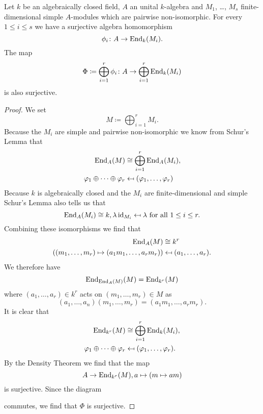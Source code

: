 \begin{lem}\label{lem: map into sum endomorphisms surjective}
 Let $k$ be an algebraically closed field, $A$ an unital $k$-algebra and $M_1$, \dots, $M_s$ finite-dimensional simple $A$-modules which are pairwise non-isomorphic. For every $1 \leq i \leq s$ we have a surjective algebra homomorphism
 \[
  \phi_i \colon A \to \operatorname{End}_k(M_i).
 \]
 The map
 \[
  \Phi \coloneqq \bigoplus_{i=1}^r \phi_i \colon A \to \bigoplus_{i=1}^r \operatorname{End}_k(M_i)
 \]
 is also surjective.
\end{lem}
\begin{proof}
 We set
 \[
  M \coloneqq \bigoplus_{i=1}^r M_i.
 \]
 Because the $M_i$ are simple and pairwise non-isomorphic we know from Schur’s Lemma that
 \begin{align*}
  \operatorname{End}_A(M) &\cong \bigoplus_{i=1}^r \operatorname{End}_A(M_i), \\
  \varphi_1 \oplus \dotsb \oplus \varphi_r &\mapsfrom (\varphi_1, \dotsc, \varphi_r)
 \end{align*}
 Because $k$ is algebraically closed and the $M_i$ are finite-dimensional and simple Schur’s Lemma also tells us that
 \[
  \operatorname{End}_A(M_i) \cong k, \lambda \operatorname{id}_{M_i} \mapsfrom \lambda \text{ for all } 1 \leq i \leq r.
 \]
 Combining these isomorphisms we find that
 \begin{align*}
  \operatorname{End}_A(M) &\cong k^r \\
  ((m_1, \dotsc, m_r) \mapsto (a_1 m_1, \dotsc, a_r m_r)) & \mapsfrom (a_1, \dotsc, a_r).
 \end{align*}
 We therefore have
 \[
  \operatorname{End}_{\operatorname{End}_A(M)}(M) = \operatorname{End}_{k^r}(M)
 \]
 where $(a_1, \dotsc, a_r) \in k^r$ acts on $(m_1, \dotsc, m_r) \in M$ as
 \[
  (a_1, \dotsc, a_n)(m_1, \dotsc, m_r) = (a_1 m_1, \dotsc, a_r m_r).
 \]
 It is clear that
 \begin{align*}
  \operatorname{End}_{k^r}(M) &\cong \bigoplus_{i=1}^r \operatorname{End}_k(M_i), \\
  \varphi_1 \oplus \dotsb \oplus \varphi_r &\mapsfrom (\varphi_1, \dotsc, \varphi_r).
 \end{align*}
 By the Density Theorem we find that the map
 \[
  A \to \operatorname{End}_{k^r}(M), a \mapsto (m \mapsto am)
 \]
 is surjective. Since the diagram
 \begin{center}
 \end{center}
 commutes, we find that $\Phi$ is surjective.
\end{proof}


